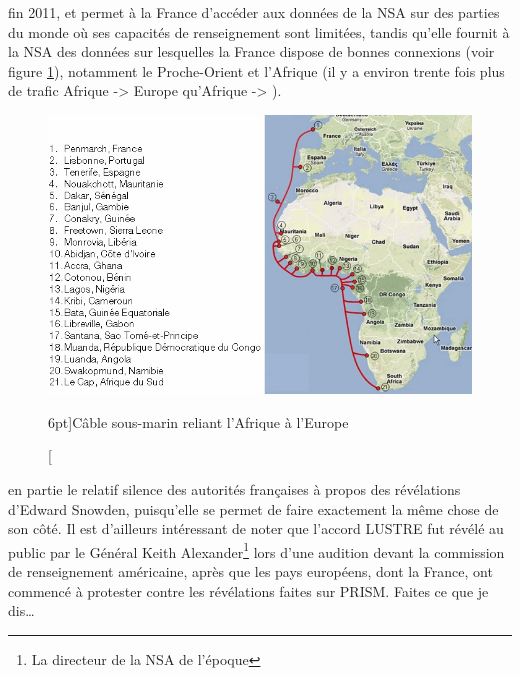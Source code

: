  fin 2011\autocite{lustre}, et permet à la France
d'accéder aux données de la NSA sur des parties du monde où ses capacités de renseignement
sont limitées, tandis qu'elle fournit à la NSA des données sur lesquelles la
France dispose de bonnes connexions (voir figure \ref{fig:french2}), notamment
le Proche-Orient et l'Afrique (il y a environ trente fois plus de trafic Afrique -> Europe qu'Afrique ->
\EUA).

\vspace{0.7cm}
\begin{figure}
\includegraphics{french2.jpg}
\caption[Câble sous-marin reliant l'Afrique à l'Europe][6pt]{Câble sous-marin
reliant l'Afrique à l'Europe}
\label{fig:french2}
\end{figure}

 en partie le relatif silence des
autorités françaises à propos des révélations d'Edward Snowden, puisqu'elle se
permet de faire exactement la même chose de son côté. Il
est d'ailleurs intéressant de noter que l'accord LUSTRE fut révélé au public par
le Général Keith Alexander\footnote{La directeur de la NSA de l'époque} lors
d'une audition devant la commission de renseignement américaine, après que les pays
européens, dont la France, ont commencé à protester contre les révélations
faites sur PRISM. Faites ce que je dis\ldots
